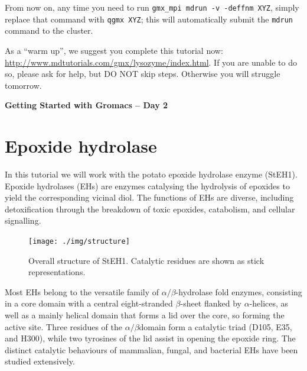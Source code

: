 \documentclass[10pt]{article}
\begin{document}
From now on, any time you need to run \texttt{gmx\_mpi mdrun -v -deffnm XYZ}, simply replace that command with \texttt{qgmx XYZ}; this will automatically submit the \texttt{mdrun} command to the cluster.

As a ``warm up'', we suggest you complete this tutorial now: \url{http://www.mdtutorials.com/gmx/lysozyme/index.html}. If you are unable to do so, please ask for help, but DO NOT skip steps. Otherwise you will struggle tomorrow.


\newpage\textbf{\LARGE Getting Started with Gromacs -- Day 2}

\section{Epoxide hydrolase}
In this tutorial we will work with the potato epoxide hydrolase enzyme (StEH1). Epoxide hydrolases (EHs) are enzymes catalysing the hydrolysis of epoxides to yield the corresponding vicinal diol.\autocite{Elfstrom2005} The functions of EHs are diverse, including detoxification through the breakdown of toxic epoxides, catabolism, and cellular signalling. 

\begin{figure}[H]
 \centering
 \texttt{[image: ./img/structure]}
 \caption{Overall structure of StEH1. Catalytic residues are shown as stick representations.}
\end{figure}

Most EHs belong to the versatile family of $\alpha/\beta$-hydrolase fold enzymes, consisting in a core domain with a central eight-stranded $\beta$-sheet flanked by $\alpha$-helices, as well as a mainly helical domain that forms a lid over the core, so forming the active site. Three residues of the $\alpha/\beta$domain form a catalytic triad (D105, E35, and H300), while two tyrosines of the lid assist in opening the epoxide ring. The distinct catalytic behaviours of mammalian, fungal, and bacterial EHs have been studied extensively.\autocite{Morisseau2005}
\end{document}
